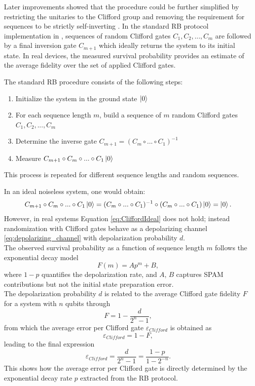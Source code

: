 Later improvements showed that the procedure could be further simplified by restricting the unitaries to the Clifford group and removing the requirement for sequences to be strictly self-inverting \cite{knill_randomized_2008}.
In the standard RB protocol implementation in \Qibocal, sequences of random Clifford gates $C_1, C_2, ..., C_m$ are followed by a final inversion gate $C_{m+1}$ which ideally returns the system to its initial state. 
In real devices, the measured survival probability provides an estimate of the average fidelity over the set of applied Clifford gates.

The standard RB procedure consists of the following steps:
\begin{enumerate}\label{routine:RB}
    \item Initialize the system in the ground state $\ket{0}$
    \item For each sequence length $m$, build a sequence of $m$ random Clifford gates $C_1, C_2, ..., C_m$
    \item Determine the inverse gate $C_{m+1}=(C_m\circ...\circ C_1)^{-1}$
    \item Measure $C_{m+1}\circ C_m \circ ...\circ C_1 \ket{0}$
\end{enumerate}
This process is repeated for different sequence lengths and random sequences.

In an ideal noiseless system, one would obtain:
\begin{equation}\label{eq:CliffordIdeal}
    C_{m+1}\circ C_m \circ ...\circ C_1 \ket{0} = (C_m\circ...\circ C_1)^{-1}\circ(C_m\circ...\circ C_1)\ket{0} = \ket{0}.
\end{equation}
However, in real systems Equation \ref{eq:CliffordIdeal} does not hold; instead randomization with Clifford gates behave as a depolarizing channel \ref{eq:depolarizing_channel} with depolarization probability $d$.\\
The observed survival probability as a function of sequence length $m$ follows the exponential decay model
\begin{equation}\label{eq:RB_decay}
    F(m) = Ap^m +B,
\end{equation}
where $1-p$ quantifies the depolarization rate, and $A$, $B$ captures SPAM contributions but not the initial state preparation error.\\
The depolarization probability $d$ is related to the average Clifford gate fidelity $F$ for a system with $n$ qubits through
\begin{equation}
    F = 1 - \frac{d}{2^n - 1}\label{eq:average_gate_fidelity},
\end{equation}
from which the average error per Clifford gate $\varepsilon_{Clifford}$ is obtained as
\begin{equation}
    \varepsilon_{Clifford} = 1 - F \label{eq:avg_error_Clifford_gate},
\end{equation}
leading to the final expression
\begin{equation}
    \varepsilon_{Clifford} = \frac{d}{2^n -1} = \frac{1-p}{1-2^{-n}}.
\end{equation}
This shows how the average error per Clifford gate is directly determined by the exponential decay rate $p$ extracted from the RB protocol.


